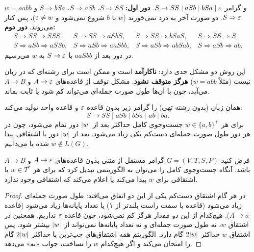 \begin{example}
$w=aabb$ و گرامر $S\to SS\mid aSb\mid bSa\mid\varepsilon$.
\textbf{دور اول:} $S\Rightarrow SS$، $S\Rightarrow aSb$، $S\Rightarrow bSa$ و $S\Rightarrow\varepsilon$. دو صورت آخر به درد نمی‌خورند ($w$ با $b$ شروع نمی‌شود و $\varepsilon\neq w$)، پس کنار می‌روند.
\textbf{دور دوم:}
\[\begin{array}{llll}
S\Rightarrow SS\Rightarrow SSS, & S\Rightarrow SS\Rightarrow aSbS, & S\Rightarrow SS\Rightarrow bSaS, & S\Rightarrow SS\Rightarrow S,\\
S\Rightarrow aSb\Rightarrow aSSb, & S\Rightarrow aSb\Rightarrow aaSbb, & S\Rightarrow aSb\Rightarrow abSab, & S\Rightarrow aSb\Rightarrow ab.
\end{array}\]
در دور بعد از $aaSbb$ با $S\to\varepsilon$ به $w$ می‌رسیم.
\end{example}

این روش دو مشکل جدی دارد: \textbf{ناکارآمد} است و ممکن است برای رشته‌ای که در زبان نیست (مثلاً $w=abb$) \textbf{هرگز متوقف نشود}. مشکل توقف از قاعده‌های $A\to\varepsilon$ و $A\to B$ می‌آید، چون با آن‌ها طول صورت جمله‌ای می‌تواند کم شود یا ثابت بماند.

\begin{example}
همان زبان (بدون رشته تهی) را گرامر زیر بدون قاعده $\varepsilon$ و قاعده واحد تولید می‌کند:
\[S\to SS\mid aSb\mid bSa\mid ab\mid ba.\]
برای هر $w\in\{a,b\}^+$ جست‌وجوی کامل حداکثر بعد از $\lvert w\rvert$ دور تمام می‌شود، چون در هر دور طول صورت جمله‌ای دست‌کم یکی زیاد می‌شود. بعد از $\lvert w\rvert$ دور یا اشتقاقی پیدا شده یا می‌دانیم $w\notin L(G)$.
\end{example}

\begin{theorem}
فرض کنید $G=(V,T,S,P)$ گرامر مستقل از متنی بدون قاعده‌های $A\to\varepsilon$ و $A\to B$ باشد. آنگاه جست‌وجوی کامل را می‌توان به الگوریتمی تبدیل کرد که برای هر $w\in T^*$ یا اشتقاقی برای $w$ پیدا می‌کند یا اعلام می‌کند که اشتقاقی وجود ندارد.
\end{theorem}
\begin{proof}
در هر گام اشتقاق دست‌کم یکی از این دو اتفاق می‌افتد: طول صورت جمله‌ای زیاد می‌شود (قاعده با سمت راست بلندتر از ۱) یا تعداد پایانه‌ها زیاد می‌شود (قاعده $A\to a$). هیچ‌کدام از این دو مقدار هرگز کم نمی‌شود، چون قاعده $\varepsilon$ نداریم. همچنین در اشتقاق $w$، نه طول صورت جمله‌ای و نه تعداد پایانه‌ها نمی‌تواند از $\lvert w\rvert$ بیشتر شود. پس اشتقاق $w$ حداکثر $2\lvert w\rvert$ گام دارد. الگوریتم همه اشتقاق‌های چپ‌ترین با حداکثر $2\lvert w\rvert$ گام را امتحان می‌کند و اگر هیچ‌کدام $w$ را نساخت، جواب «نه» می‌دهد.
\end{proof}

